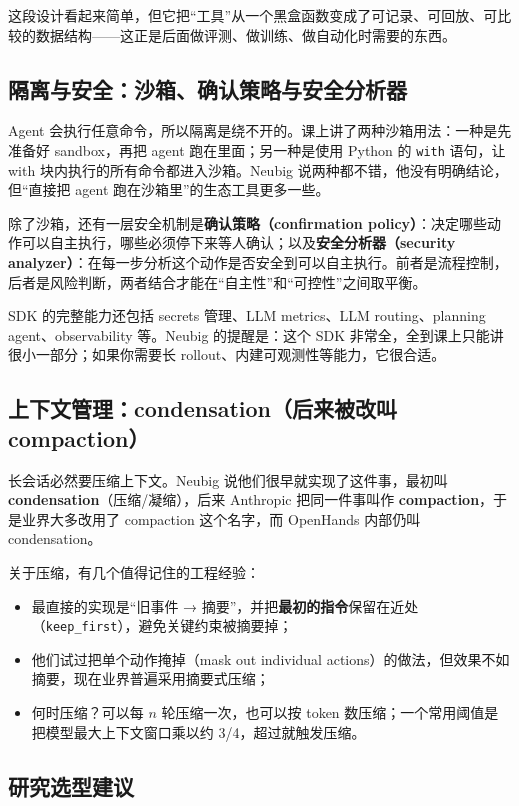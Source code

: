 \documentclass[a4paper]{article}
\begin{document}
这段设计看起来简单，但它把“工具”从一个黑盒函数变成了可记录、可回放、可比较的数据结构——这正是后面做评测、做训练、做自动化时需要的东西。

\subsection{隔离与安全：沙箱、确认策略与安全分析器}

Agent 会执行任意命令，所以隔离是绕不开的。课上讲了两种沙箱用法：一种是先准备好 sandbox，再把 agent 跑在里面；另一种是使用 Python 的 \texttt{with} 语句，让 with 块内执行的所有命令都进入沙箱。Neubig 说两种都不错，他没有明确结论，但“直接把 agent 跑在沙箱里”的生态工具更多一些。

除了沙箱，还有一层安全机制是\textbf{确认策略（confirmation policy）}：决定哪些动作可以自主执行，哪些必须停下来等人确认；以及\textbf{安全分析器（security analyzer）}：在每一步分析这个动作是否安全到可以自主执行。前者是流程控制，后者是风险判断，两者结合才能在“自主性”和“可控性”之间取平衡。

SDK 的完整能力还包括 secrets 管理、LLM metrics、LLM routing、planning agent、observability 等。Neubig 的提醒是：这个 SDK 非常全，全到课上只能讲很小一部分；如果你需要长 rollout、内建可观测性等能力，它很合适。

\subsection{上下文管理：condensation（后来被改叫 compaction）}

长会话必然要压缩上下文。Neubig 说他们很早就实现了这件事，最初叫 \textbf{condensation}（压缩/凝缩），后来 Anthropic 把同一件事叫作 \textbf{compaction}，于是业界大多改用了 compaction 这个名字，而 OpenHands 内部仍叫 condensation。

关于压缩，有几个值得记住的工程经验：

\begin{itemize}
\item 最直接的实现是“旧事件 → 摘要”，并把\textbf{最初的指令}保留在近处（\texttt{keep\_first}），避免关键约束被摘要掉；
\item 他们试过把单个动作掩掉（mask out individual actions）的做法，但效果不如摘要，现在业界普遍采用摘要式压缩；
\item 何时压缩？可以每 $n$ 轮压缩一次，也可以按 token 数压缩；一个常用阈值是把模型最大上下文窗口乘以约 3/4，超过就触发压缩。
\end{itemize}

\subsection{研究选型建议}
\end{document}
